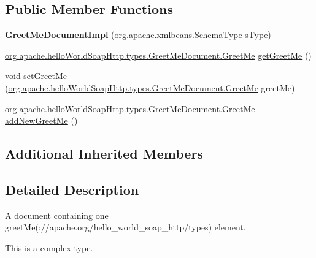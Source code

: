 \subsection*{Public Member Functions}
\begin{DoxyCompactItemize}
\item 
\hypertarget{classorg_1_1apache_1_1hello_world_soap_http_1_1types_1_1impl_1_1_greet_me_document_impl_ac75730ce85f42cc1de8bc0848e7c9dd0}{}{\bfseries Greet\+Me\+Document\+Impl} (org.\+apache.\+xmlbeans.\+Schema\+Type s\+Type)\label{classorg_1_1apache_1_1hello_world_soap_http_1_1types_1_1impl_1_1_greet_me_document_impl_ac75730ce85f42cc1de8bc0848e7c9dd0}

\item 
\hyperlink{interfaceorg_1_1apache_1_1hello_world_soap_http_1_1types_1_1_greet_me_document_1_1_greet_me}{org.\+apache.\+hello\+World\+Soap\+Http.\+types.\+Greet\+Me\+Document.\+Greet\+Me} \hyperlink{classorg_1_1apache_1_1hello_world_soap_http_1_1types_1_1impl_1_1_greet_me_document_impl_a03fa0b11a597a127da3bac866955cb7d}{get\+Greet\+Me} ()
\item 
void \hyperlink{classorg_1_1apache_1_1hello_world_soap_http_1_1types_1_1impl_1_1_greet_me_document_impl_ad4fa96553894cda83fd32677ca21d324}{set\+Greet\+Me} (\hyperlink{interfaceorg_1_1apache_1_1hello_world_soap_http_1_1types_1_1_greet_me_document_1_1_greet_me}{org.\+apache.\+hello\+World\+Soap\+Http.\+types.\+Greet\+Me\+Document.\+Greet\+Me} greet\+Me)
\item 
\hyperlink{interfaceorg_1_1apache_1_1hello_world_soap_http_1_1types_1_1_greet_me_document_1_1_greet_me}{org.\+apache.\+hello\+World\+Soap\+Http.\+types.\+Greet\+Me\+Document.\+Greet\+Me} \hyperlink{classorg_1_1apache_1_1hello_world_soap_http_1_1types_1_1impl_1_1_greet_me_document_impl_ab5b693303464c0a80362906b1f24e4cb}{add\+New\+Greet\+Me} ()
\end{DoxyCompactItemize}
\subsection*{Additional Inherited Members}


\subsection{Detailed Description}
A document containing one greet\+Me(\+://apache.org/hello\+\_\+world\+\_\+soap\+\_\+http/types) element.

This is a complex type. 

